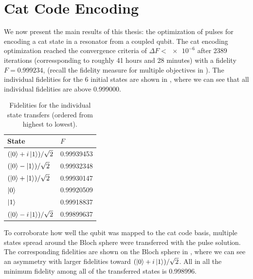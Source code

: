 \documentclass[main.tex]{subfiles}
\begin{document}
\clearpage{}
\section{Cat Code Encoding}
We now present the main results of this thesis: the optimization of pulses for encoding a cat state in a resonator from a coupled qubit.
The cat encoding optimization reached the convergence criteria of \(\Delta F < \num{e-6}\) after 2389 iterations (corressponding to roughly 41 hours and 28 minutes) with a fidelity \(F = 0.999234\), (recall the fidelity measure for multiple objectives in ).
The individual fidelities for the 6 initial states are shown in , where we can see that all individual fidelities are above 0.999000.

\begin{table}[ht]
    \caption{Fidelities for the individual state transfers (ordered from highest to lowest).}%
    \label{tab:cat-fidelities}
    \centering
    \begin{tabular}{@{}ll@{}}
    \toprule
    State & \(F\)\\ \midrule
	\((\ket{0}+i\ket{1})/\sqrt{2}\) & 0.99939453 \\
	\((\ket{0}-\ket{1})/\sqrt{2}\) & 0.99932348 \\
	\((\ket{0}+\ket{1})/\sqrt{2}\) & 0.99930147 \\
    \(\ket{0}\) & 0.99920509 \\
	\(\ket{1}\) & 0.99918837 \\
	\((\ket{0}-i\ket{1})/\sqrt{2}\) & 0.99899637 \\
    \bottomrule
    \end{tabular}
\end{table}

To corroborate how well the qubit was mapped to the cat code basis, multiple states spread around the Bloch sphere were transferred with the pulse solution.
The corresponding fidelities are shown on the Bloch sphere in , where we can see an asymmetry with larger fidelities toward \((\ket{0}+i\ket{1})/\sqrt{2}\).
All in all the minimum fidelity among all of the transferred states is 0.998996.
\end{document}
